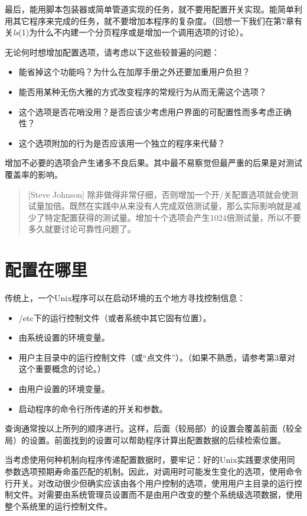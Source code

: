 \documentclass[12pt,oneside]{book}
\begin{document}
\begin{common-format}
最后，能用脚本包装器或简单管道实现的任务，就不要用配置开关实现。能简单利用其它程序来完成的任务，就不要增加本程序的复杂度。（回想一下我们在第7章有关\textit{ls}(1)为什么不内建一个分页程序或是增加一个调用选项的讨论）。

无论何时想增加配置选项，请考虑以下这些较普遍的问题：
\begin{itemize}
\item  能省掉这个功能吗？为什么在加厚手册之外还要加重用户负担？
\item  能否用某种无伤大雅的方式改变程序的常规行为从而无需这个选项？
\item  这个选项是否花哨没用？是否应该少考虑用户界面的可配置性而多考虑正确性？
\item  这个选项附加的行为是否应该用一个独立的程序来代替？  
\end{itemize} 

增加不必要的选项会产生诸多不良后果。其中最不易察觉但最严重的后果是对测试覆盖率的影响。
\begin{quote}[Steve Johnson]
除非做得非常仔细，否则增加一个开/关配置选项就会使测试量加倍。既然在实践中从来没有人完成双倍测试量，那么实际影响就是减少了特定配置获得的测试量。增加十个选项会产生1024倍测试量，所以不要多久就要讨论可靠性问题了。
\end{quote}

\section{配置在哪里}
传统上，一个Unix程序可以在启动环境的五个地方寻找控制信息：
\begin{itemize}
\item /etc下的运行控制文件（或者系统中其它固有位置）。
\item 由系统设置的环境变量。
\item 用户主目录中的运行控制文件（或“点文件”）。（如果不熟悉，请参考第3章对这个重要概念的讨论。）
\item 由用户设置的环境变量。
\item 启动程序的命令行所传递的开关和参数。
\end{itemize}

查询通常按以上所列的顺序进行。这样，后面（较局部）的设置会覆盖前面（较全局）的设置。前面找到的设置可以帮助程序计算出配置数据的后续检索位置。

当考虑使用何种机制向程序传递配置数据时，要牢记：好的Unix实践要求使用同参数选项预期寿命虽匹配的机制。因此，对调用时可能发生变化的选项，使用命令行开关。对改动很少但确实应该由各个用户控制的选项，使用用户主目录的运行控制文件。对需要由系统管理员设置而不是由用户改变的整个系统级选项数据，使用整个系统里的运行控制文件。


\end{common-format}
\end{document}

